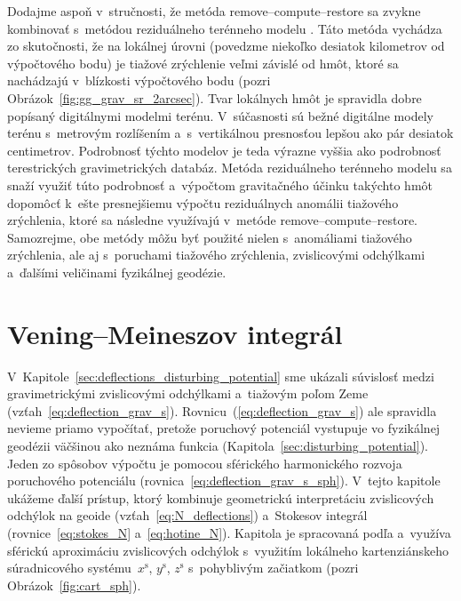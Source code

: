 \documentclass[a4paper,12pt]{book}
\begin{document}
Dodajme aspoň v~stručnosti, že metóda remove--compute--restore sa zvykne 
kombinovať s~metódou reziduálneho terénneho modelu 
\parencite{Forsberg1981,Forsberg1984}.  Táto metóda vychádza zo skutočnosti, že 
na lokálnej úrovni (povedzme niekoľko desiatok kilometrov od výpočtového bodu) 
je tiažové zrýchlenie veľmi závislé od hmôt, ktoré sa nachádzajú v~blízkosti 
výpočtového bodu (pozri Obrázok~\ref{fig:gg_grav_sr_2arcsec}).  Tvar lokálnych 
hmôt je spravidla dobre popísaný digitálnymi modelmi terénu.  V~súčasnosti sú 
bežné digitálne modely terénu s~metrovým rozlíšením a~s~vertikálnou presnosťou 
lepšou ako pár desiatok centimetrov.  Podrobnosť týchto modelov je teda výrazne 
vyššia ako podrobnosť terestrických gravimetrických databáz.  Metóda 
reziduálneho terénneho modelu sa snaží využiť túto podrobnosť a~výpočtom 
gravitačného účinku takýchto hmôt dopomôcť k~ešte presnejšiemu výpočtu 
reziduálnych anomálii tiažového zrýchlenia, ktoré sa následne využívajú 
v~metóde remove--compute--restore.  Samozrejme, obe metódy môžu byť použité 
nielen s~anomáliami tiažového zrýchlenia, ale aj s~poruchami tiažového 
zrýchlenia, zvislicovými odchýlkami a~ďalšími veličinami fyzikálnej geodézie.




\section{Vening--Meineszov integrál}
\label{sec:vm_integral}

V~Kapitole~\ref{sec:deflections_disturbing_potential} sme ukázali súvislosť 
medzi gravimetrickými zvislicovými odchýlkami a~tiažovým poľom Zeme 
(vzťah~\ref{eq:deflection_grav_s}).  Rovnicu~(\ref{eq:deflection_grav_s}) ale 
spravidla nevieme priamo vypočítať, pretože poruchový potenciál vystupuje vo 
fyzikálnej geodézii väčšinou ako neznáma funkcia 
(Kapitola~\ref{sec:disturbing_potential}).  Jeden zo spôsobov výpočtu je 
pomocou sférického harmonického rozvoja poruchového potenciálu 
(rovnica~\ref{eq:deflection_grav_s_sph}).  V~tejto kapitole ukážeme ďalší 
prístup, ktorý kombinuje geometrickú interpretáciu zvislicových odchýlok na 
geoide (vzťah~\ref{eq:N_deflections}) a~Stokesov integrál 
(rovnice~\ref{eq:stokes_N} a~\ref{eq:hotine_N}).  Kapitola je spracovaná podľa 
\textcite{MoritzPhysicalGeodesy} a~využíva sférickú aproximáciu zvislicových 
odchýlok s~využitím lokálneho kartenziánskeho súradnicového 
systému~$x^\mathrm{s}$, $y^\mathrm{s}$, $z^\mathrm{s}$ s~pohyblivým začiatkom 
(pozri Obrázok~\ref{fig:cart_sph}).
\end{document}
